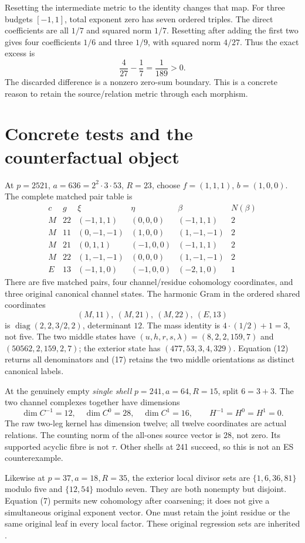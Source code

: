 Resetting the intermediate metric to the identity changes that map.
For three budgets $[-1,1]$, total exponent zero has seven ordered triples.
The direct coefficients are all $1/7$ and squared norm $1/7$.
Resetting after adding the first two gives four coefficients $1/6$ and
three $1/9$, with squared norm $4/27$. Thus the exact excess is
\[
 \boxed{\frac4{27}-\frac17=\frac1{189}>0.}           \tag{21}
\]
The discarded difference is a nonzero zero-sum boundary. This is a concrete
reason to retain the source/relation metric through each morphism.

\section{Concrete tests and the counterfactual object}
At $p=2521$, $a=636=2^2\cdot3\cdot53$, $R=23$, choose
$f=(1,1,1)$, $b=(1,0,0)$. The complete matched pair table is
\[
\begin{array}{c|r|r|r|r|r}
c&g&\xi&\eta&\beta&N(\beta)\\\hline
M&22&(-1,1,1)&(0,0,0)&(-1,1,1)&2\\
M&11&(0,-1,-1)&(1,0,0)&(1,-1,-1)&2\\
M&21&(0,1,1)&(-1,0,0)&(-1,1,1)&2\\
M&22&(1,-1,-1)&(0,0,0)&(1,-1,-1)&2\\
E&13&(-1,1,0)&(-1,0,0)&(-2,1,0)&1
\end{array}
\]
There are five matched pairs, four channel/residue cohomology coordinates,
and three original canonical channel states. The harmonic Gram in the
ordered shared coordinates
\[ (M,11),\ (M,21),\ (M,22),\ (E,13) \]
is $\operatorname{diag}(2,2,3/2,2)$, determinant $12$. The mass identity is
$4\cdot(1/2)+1=3$, not five. The two middle states have
$(u,h,r,s,\lambda)=(8,2,2,159,7)$ and $(50562,2,159,2,7)$; the exterior
state has $(477,53,3,4,329)$. Equation (12) returns all denominators and
(17) retains the two middle orientations as distinct canonical labels.

At the genuinely empty \emph{single shell} $p=241,a=64,R=15$, split
$6=3+3$. The two channel complexes together have dimensions
\[
 \dim C^{-1}=12,\quad \dim C^0=28,\quad\dim C^1=16,
 \qquad H^{-1}=H^0=H^1=0.
\]
The raw two-leg kernel has dimension twelve; all twelve coordinates are
actual relations. The counting norm of the all-ones source vector is
$28$, not zero. Its supported acyclic fibre is not $\tau$. Other shells
at 241 succeed, so this is not an ES counterexample.

Likewise at $p=37,a=18,R=35$, the exterior local divisor sets are
$\{1,6,36,81\}$ modulo five and $\{12,54\}$ modulo seven. They are both
nonempty but disjoint. Equation (7) permits new cohomology after
coarsening; it does not give a simultaneous original exponent vector.
One must retain the joint residue or the same original leaf in every local
factor. These original regression sets are inherited \cite{ESBase}.

